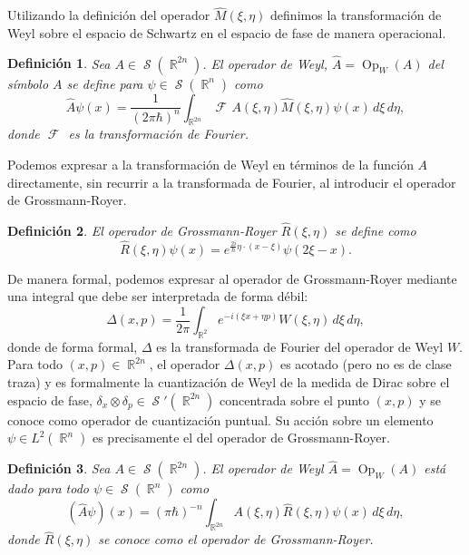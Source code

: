 \documentclass[a4paper]{report}
\DeclareMathOperator{\R}{\mathbb{R}}
\DeclareMathOperator{\Sz}{\mathcal S}
\DeclareMathOperator{\Op}{Op}
\DeclareMathOperator{\F}{\mathcal{F}\!}
\newtheorem{definition}{Definición}
\begin{document}
  Utilizando la definición del operador $\hat{M}(\xi,\eta)$
  definimos la transformación de Weyl sobre el espacio de
  Schwartz en el espacio de fase de manera operacional.
  \begin{definition}
    Sea $A \in \Sz(\R^{2n})$. El operador de Weyl, $\hat{A}
    = \Op_W(A)$ del símbolo $A$ se define para $\psi \in
    \Sz(\R^{n})$ como
    \begin{equation}
      \label{eqn:weyl_quant_2}
      \hat{A}\psi(x)
      = \frac{1}{(2\pi\hbar)^{n}}
      \int_{\R^{2n}} \F A(\xi,\eta) \hat{M}(\xi,\eta)
      \psi(x) \, d\xi \, d\eta,
    \end{equation}
    donde $\F$ es la transformación de Fourier.
  \end{definition}
  
  Podemos expresar a la transformación de Weyl en términos
  de la función $A$ directamente, sin recurrir a la
  transformada de Fourier, al introducir el operador de
  Grossmann-Royer.
  \begin{definition}
    El operador de Grossmann-Royer $\hat{R}(\xi,\eta)$ se
    define como
    \begin{equation}
      \label{eqn:grossmann_royer_op}
      \hat{R}(\xi,\eta)\psi(x)
      = e^{\frac{2i}{\hbar} \eta \cdot (x - \xi)} \psi(2\xi
      - x).
    \end{equation} 
  \end{definition}
  
  De manera formal, podemos expresar al operador de
  Grossmann-Royer mediante una integral que debe ser
  interpretada de forma débil:
  \[
    \Delta(x,p)
    = \frac{1}{2\pi} \int_{\R^2} e^{-i(\xi x + \eta p)}
    W(\xi,\eta) \, d\xi \, d\eta,
  \] 
  donde de forma formal, $\Delta$ es la transformada de
  Fourier del operador de Weyl $W$. Para todo $(x,p) \in
  \R^{2n}$, el operador $\Delta(x,p)$ es acotado (pero no es
  de clase traza) y es formalmente la cuantización de Weyl
  de la medida de Dirac sobre el espacio de fase, $\delta_x
  \otimes \delta_p \in \Sz'(\R^{2n})$ concentrada sobre el
  punto $(x,p)$ y se conoce como operador de cuantización
  puntual. Su acción sobre un elemento $\psi \in
  L^2(\R^{n})$ es precisamente el del operador de
  Grossmann-Royer. 

  \begin{definition}
    Sea $A \in \Sz(\R^{2n})$. El operador de Weyl $\hat{A} =
    \Op_W(A)$ está dado para todo $\psi \in \Sz(\R^{n})$ 
    como
    \begin{equation}
      \left( \hat{A}\psi \right)(x)
      = (\pi\hbar)^{-n} \int_{\R^{2n}}
      A(\xi,\eta)\hat{R}(\xi,\eta)\psi(x) \, d\xi \, d\eta,
    \end{equation}
    donde $\hat{R}(\xi,\eta)$ se conoce como el operador de
    Grossmann-Royer.
  \end{definition}
\end{document}

